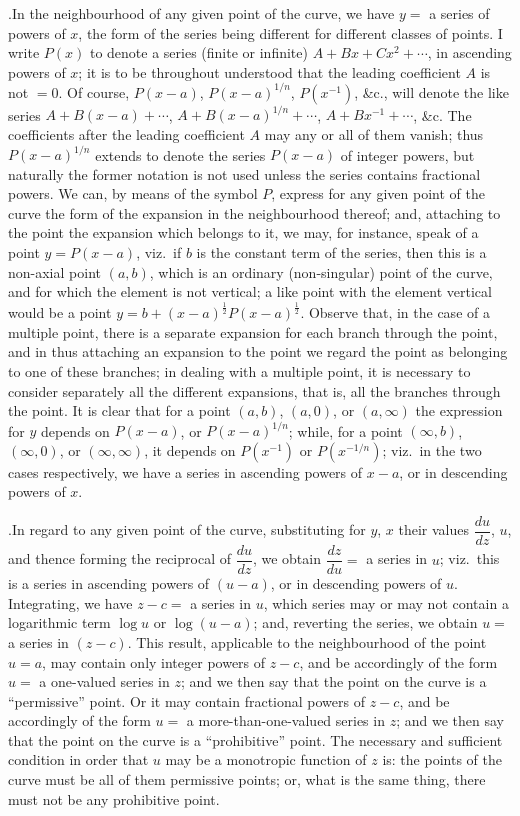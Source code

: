 \documentclass[11pt]{article}
\begin{document}
.\quad In the neighbourhood of any given point of the curve, we have $y=$ a series of powers of $x$, the form of the series being different for different classes of points. I write $P(x)$ to denote a series (finite or infinite) $A+Bx+Cx^{2}+\cdots$, in ascending powers of $x$; it is to be throughout understood that the leading coefficient $A$ is not $=0$. Of course, $P(x-a)$, $P(x-a)^{1/n}$, $P(x^{-1})$, \&c., will denote the like series $A+B(x-a)+\cdots$, $A+B(x-a)^{1/n}+\cdots$, $A+Bx^{-1}+\cdots$, \&c. The coefficients after the leading coefficient $A$ may any or all of them vanish; thus $P(x-a)^{1/n}$ extends to denote the series $P(x-a)$ of integer powers, but naturally the former notation is not used unless the series contains fractional powers. We can, by means of the symbol $P$, express for any given point of the curve the form of the expansion in the neighbourhood thereof; and, attaching to the point the expansion which belongs to it, we may, for instance, speak of a point $y=P(x-a)$, viz.\ if $b$ is the constant term of the series, then this is a non-axial point $(a,b)$, which is an ordinary (non-singular) point of the curve, and for which the element is not vertical; a like point with the element vertical would be a point $y=b+(x-a)^{\frac{1}{2}}P(x-a)^{\frac{1}{2}}$. Observe that, in the case of a multiple point, there is a separate expansion for each branch through the point, and in thus attaching an expansion to the point we regard the point as belonging to one of these branches; in dealing with a multiple point, it is necessary to consider separately all the different expansions, that is, all the branches through the point. It is clear that for a point $(a,b)$, $(a,0)$, or $(a,\infty)$ the expression for $y$ depends on $P(x-a)$, or $P(x-a)^{1/n}$; while, for a point $(\infty,b)$, $(\infty,0)$, or $(\infty,\infty)$, it depends on $P(x^{-1})$ or $P(x^{-1/n})$; viz.\ in the two cases respectively, we have a series in ascending powers of $x-a$, or in descending powers of $x$.

\medskip

.\quad In regard to any given point of the curve, substituting for $y$, $x$ their values $\dfrac{du}{dz}$, $u$, and thence forming the reciprocal of $\dfrac{du}{dz}$, we obtain $\dfrac{dz}{du} =$ a series in $u$; viz.\ this is a series in ascending powers of $(u-a)$, or in descending powers of $u$. Integrating, we have $z-c =$ a series in $u$, which series may or may not contain a logarithmic term $\log u$ or $\log(u-a)$; and, reverting the series, we obtain $u=$ a series in $(z-c)$. This result, applicable to the neighbourhood of the point $u=a$, may contain only integer powers of $z-c$, and be accordingly of the form $u=$ a one-valued series in $z$; and we then say that the point on the curve is a ``permissive'' point. Or it may contain fractional powers of $z-c$, and be accordingly of the form $u=$ a more-than-one-valued series in $z$; and we then say that the point on the curve is a ``prohibitive'' point. The necessary and sufficient condition in order that $u$ may be a monotropic function of $z$ is: the points of the curve must be all of them permissive points; or, what is the same thing, there must not be any prohibitive point.
\end{document}
